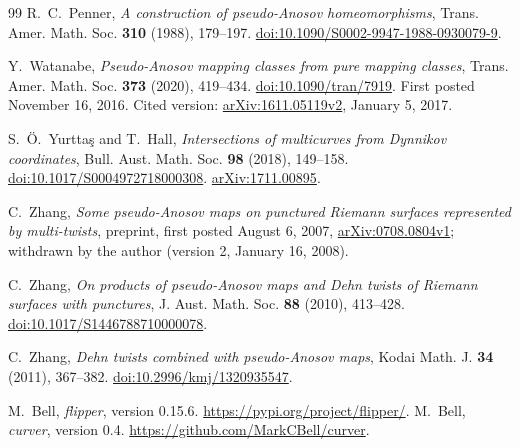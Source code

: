 \documentclass[11pt]{article}
\theoremstyle{remark}
\newcommand{\doi}[1]{\href{https://doi.org/#1}{doi:#1}}
\begin{document}
\begin{thebibliography}{99}
 R.~C.~Penner, \emph{A construction of pseudo-Anosov
homeomorphisms}, Trans. Amer. Math. Soc. \textbf{310} (1988), 179--197.
\doi{10.1090/S0002-9947-1988-0930079-9}.

 Y.~Watanabe, \emph{Pseudo-Anosov mapping classes from
pure mapping classes}, Trans. Amer. Math. Soc. \textbf{373} (2020),
419--434. \doi{10.1090/tran/7919}. First posted November 16, 2016.
Cited version: \href{https://arxiv.org/abs/1611.05119v2}{arXiv:1611.05119v2},
January 5, 2017.

 S.~Ö.~Yurttaş and T.~Hall, \emph{Intersections of multicurves
from Dynnikov coordinates}, Bull. Aust. Math. Soc. \textbf{98} (2018),
149--158. \doi{10.1017/S0004972718000308}.
\href{https://arxiv.org/abs/1711.00895}{arXiv:1711.00895}.

 C.~Zhang, \emph{Some pseudo-Anosov maps on punctured
Riemann surfaces represented by multi-twists}, preprint, first posted
August 6, 2007, \href{https://arxiv.org/abs/0708.0804v1}{arXiv:0708.0804v1};
withdrawn by the author (version 2, January 16, 2008).

 C.~Zhang, \emph{On products of pseudo-Anosov maps and
Dehn twists of Riemann surfaces with punctures}, J. Aust. Math. Soc.
\textbf{88} (2010), 413--428. \doi{10.1017/S1446788710000078}.

 C.~Zhang, \emph{Dehn twists combined with pseudo-Anosov
maps}, Kodai Math. J. \textbf{34} (2011), 367--382.
\doi{10.2996/kmj/1320935547}.

 M.~Bell, \emph{flipper}, version 0.15.6.
\url{https://pypi.org/project/flipper/}.
 M.~Bell, \emph{curver}, version 0.4.
\url{https://github.com/MarkCBell/curver}.

\end{thebibliography}
\end{document}

